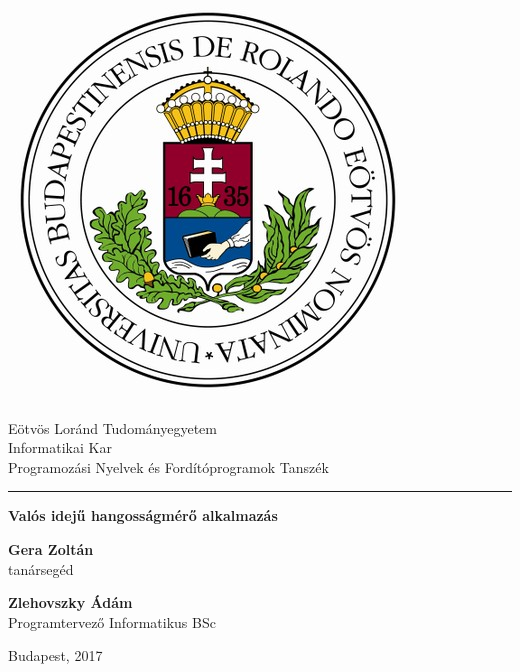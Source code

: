 \documentclass[12pt]{article}
\begin{document}
\begin{titlepage}

\begin{minipage}{0.40\linewidth}
\includegraphics[scale=0.3]{elte-cimer.jpg}
\end{minipage}
\begin{minipage}{0.50\linewidth}
\begin{center}
Eötvös Loránd Tudományegyetem \\
Informatikai Kar \\
Programozási Nyelvek és Fordítóprogramok Tanszék
\end{center}
\end{minipage}

\hrule
\vfill

\begin{center}
\Huge
\textbf{Valós idejű hangosságmérő alkalmazás}
\normalsize
\end{center}

\vfill

\begin{minipage}[t]{0.5\linewidth}
\begin{flushleft}
\textbf{Gera Zoltán} \\
tanársegéd
\end{flushleft}
\end{minipage}
\begin{minipage}[t]{0.5\linewidth}
\begin{flushright}
\textbf{Zlehovszky Ádám} \\
Programtervező Informatikus BSc
\end{flushright}
\end{minipage}

\vfill

\begin{center}
Budapest, 2017
\end{center}

\end{titlepage}
\end{document}
